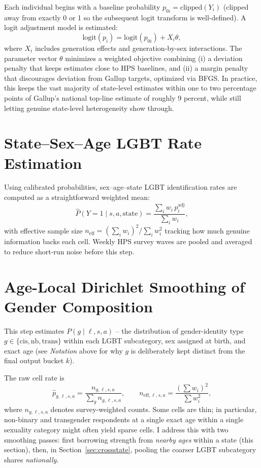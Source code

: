 \documentclass[11pt]{article}
\begin{document}
Each individual begins with a baseline probability $p_{0i} =
\text{clipped}(Y_i)$ (clipped away from exactly 0 or 1 so the subsequent
logit transform is well-defined). A logit adjustment model is estimated:
\[
\text{logit}(p_i) = \text{logit}(p_{0i}) + X_i \theta,
\]
where $X_i$ includes generation effects and generation-by-sex interactions.
The parameter vector $\theta$ minimizes a weighted objective combining
(i) a deviation penalty that keeps estimates close to HPS baselines, and
(ii) a margin penalty that discourages deviation from Gallup targets,
optimized via BFGS. In practice, this keeps the vast majority of
state-level estimates within one to two percentage points of Gallup's
national top-line estimate of roughly 9 percent, while still letting
genuine state-level heterogeneity show through.

\section{State--Sex--Age LGBT Rate Estimation}

Using calibrated probabilities, sex--age--state LGBT identification rates
are computed as a straightforward weighted mean:
\[
\widehat{P}(Y=1 \mid s, a, \text{state})
=
\frac{\sum_i w_i\, p_i^{\text{adj}}}{\sum_i w_i},
\]
with effective sample size $n_{\text{eff}} = (\sum_i w_i)^2 / \sum_i
w_i^2$ tracking how much genuine information backs each cell. Weekly HPS
survey waves are pooled and averaged to reduce short-run noise before this
step.

\section{Age-Local Dirichlet Smoothing of Gender Composition}
\label{sec:dirichlet}

This step estimates $P(g \mid \ell, s, a)$ -- the distribution of
gender-identity type $g \in \{\text{cis}, \text{nb}, \text{trans}\}$ within
each LGBT subcategory, sex assigned at birth, and exact age (see
\emph{Notation} above for why $g$ is deliberately kept distinct from the
final output bucket $k$).

The raw cell rate is
\[
\hat{p}_{g,\ell,s,a} = \frac{n_{g,\ell,s,a}}{\sum_g n_{g,\ell,s,a}},
\qquad
n_{\text{eff},\ell,s,a} = \frac{(\sum w_i)^2}{\sum w_i^2},
\]
where $n_{g,\ell,s,a}$ denotes survey-weighted counts. Some cells are thin;
in particular, non-binary and transgender respondents at a single exact age within
a single sexuality category might often yield sparse cells. 
I address this with two smoothing passes: first
borrowing strength from \emph{nearby ages} within a state (this section),
then, in Section~\ref{sec:crossstate}, pooling the coarser LGBT subcategory
shares \emph{nationally}.
\end{document}
